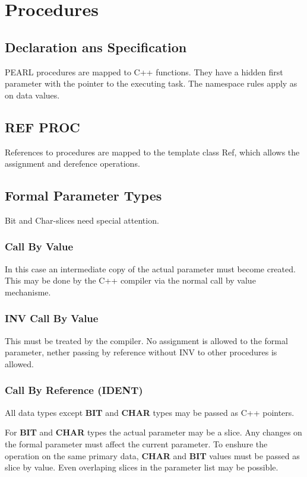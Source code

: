 \chapter{Procedures}

\section{Declaration ans Specification}
PEARL procedures are mapped to C++ functions.
They have a hidden first parameter with the pointer to the executing task.
The namespace rules apply as on data values.


\section{REF PROC}
References to procedures are mapped to the template class Ref, which allows
the assignment and derefence operations.

\section{Formal Parameter Types}
Bit and Char-slices need special attention.

\subsection{Call By Value}
In this case an intermediate copy of the actual parameter 
must become created. This may be done by the C++ compiler via the 
normal call by value mechanisme.

\subsection{INV Call By Value}
This must be treated by the compiler. No assignment is allowed to the formal 
parameter, nether passing by reference without INV to other
procedures is allowed.

\subsection{Call By Reference (IDENT)}
All data types except \textbf{BIT} and \textbf{CHAR} types may be 
passed as C++ pointers.

For \textbf{BIT} and \textbf{CHAR} types the actual parameter may be a slice.
Any changes on the formal parameter must affect the current parameter.
To enshure the operation on the same primary data, \textbf{CHAR} and 
\textbf{BIT} values 
must be passed as slice by value. 
Even overlaping slices in the parameter list may be possible.


